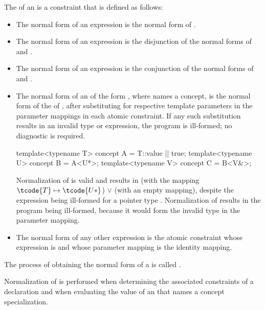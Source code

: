\pnum
The  of an   is
a constraint that is defined as follows:
%
\begin{itemize}
\item
The normal form of an expression  is
the normal form of .

\item
The normal form of an expression  is
the disjunction of
the normal forms of  and .

\item
The normal form of an expression 
is the conjunction of
the normal forms of  and .

\item
The normal form of an  of the form
, where  names a concept,
is the normal form of the  of ,
after substituting  for
 respective template parameters in the
parameter mappings in each atomic constraint.
If any such substitution results in an invalid type or expression,
the program is ill-formed; no diagnostic is required.
\begin{example}
\begin{codeblock}
template<typename T> concept A = T::value || true;
template<typename U> concept B = A<U*>;
template<typename V> concept C = B<V&>;
\end{codeblock}
Normalization of  
is valid and results in
 (with the mapping $\tcode{T} \mapsto \tcode{U*}$)
$\lor$
 (with an empty mapping),
despite the expression  being ill-formed
for a pointer type .
Normalization of  
results in the program being ill-formed,
because it would form the invalid type 
in the parameter mapping.
\end{example}

\item
The normal form of any other expression  is
the atomic constraint
whose expression is  and
whose parameter mapping is the identity mapping.
\end{itemize}

\pnum
The process of obtaining the normal form of a
is called
.
\begin{note}
Normalization of 
is performed
when determining the associated constraints
of a declaration
and
when evaluating the value of an 
that names a concept specialization.
\end{note}

